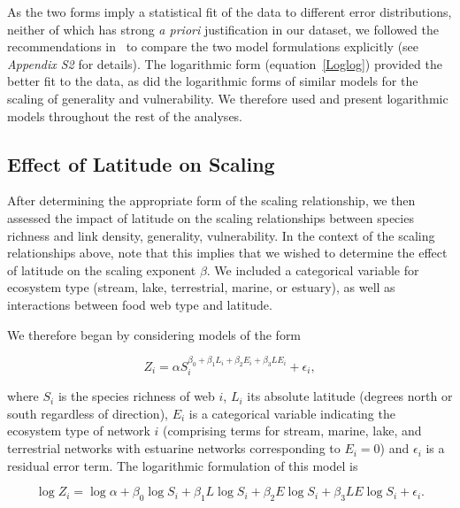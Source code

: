 \documentclass[12pt]{article}
\begin{document}
    \noindent As the two forms imply a statistical fit of the data to different error 
    distributions, neither of which has strong
    \emph{a priori} justification in our dataset, we followed the recommendations in~\cite{Xiao2011}
    to compare the two model formulations explicitly (see \emph{Appendix S2} for details). 
    The logarithmic form (equation~\ref{Loglog}) provided the better fit to the data,
    as did the logarithmic forms of similar models for the scaling of generality and vulnerability. 
    We therefore used and present logarithmic models throughout the rest of the analyses.


  \subsection*{Effect of Latitude on Scaling}


    After determining the appropriate form of the scaling relationship, we
    then assessed the impact of latitude on the scaling relationships between
    species richness and link density, generality, vulnerability. In the
    context of the scaling relationships above, note  that this implies that
    we wished to determine the effect of latitude on the scaling exponent
    $\beta$. We included a categorical variable for
    ecosystem type (stream, lake,  terrestrial, marine, or estuary), as well
    as interactions between food web type and latitude.


    We therefore began by considering models of the form

    \begin{equation}
    \label{PowerLat}
    Z_{i}=\alpha S_{i}^{\beta_{0}+\beta_{1}L_{i}+\beta_{2}E_{i}+\beta_{3}LE_{i}} + \epsilon_{i} ,
    \end{equation}

    \noindent where $S_{i}$ is the species richness of web $i$, $L_{i}$ its absolute
    latitude (degrees north or south  regardless of direction), $E_{i}$ is a categorical
    variable indicating the ecosystem type of network $i$ (comprising terms for stream, 
    marine, lake, and terrestrial networks with estuarine
    networks corresponding to $E_{i}=0$) and $\epsilon_{i}$ is a residual error term.
    The logarithmic formulation of this model is

    \begin{equation}
    \label{LogLat}
    \log{Z_{i}} = \log{\alpha}+\beta_{0}\log{S_{i}} + \beta_{1}L\log{S_{i}} +\beta_{2}E\log{S_{i}} +\beta_{3}LE\log{S_{i}} +\epsilon_{i} .
    \end{equation}
\end{document}

